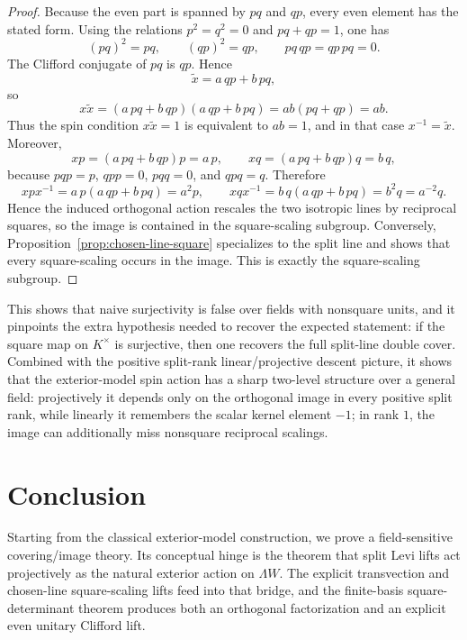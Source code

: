 \documentclass{birkjour}
\theoremstyle{plain}
\theoremstyle{definition}
\theoremstyle{remark}
\newcommand{\wedgeW}{\Lambda W}
\begin{document}
\begin{proof}
Because the even part is spanned by $pq$ and $qp$, every even element has the
stated form. Using the relations $p^2=q^2=0$ and $pq+qp=1$, one has
\[
  (pq)^2=pq,\qquad (qp)^2=qp,\qquad pq\,qp=qp\,pq=0.
\]
The Clifford conjugate of \(pq\) is \(qp\).
Hence
\[
  \tilde x = a\,qp+b\,pq,
\]
so
\[
  x\tilde x
  =(a\,pq+b\,qp)(a\,qp+b\,pq)
  =ab(pq+qp)
  =ab.
\]
Thus the spin condition $x\tilde x=1$ is equivalent to $ab=1$, and in that case
$x^{-1}=\tilde x$. Moreover,
\[
  xp=(a\,pq+b\,qp)p=a\,p,\qquad xq=(a\,pq+b\,qp)q=b\,q,
\]
because $pqp=p$, $qpp=0$, $pqq=0$, and $qpq=q$. Therefore
\[
  xpx^{-1}=a\,p(a\,qp+b\,pq)=a^2p,
  \qquad
  xqx^{-1}=b\,q(a\,qp+b\,pq)=b^2q=a^{-2}q.
\]
Hence the induced orthogonal action rescales the two isotropic lines by
reciprocal squares, so the image is contained in the square-scaling subgroup.
Conversely, Proposition~{}\ref{prop:chosen-line-square} specializes to the split
line and shows that every square-scaling occurs in the image. This is exactly
the square-scaling subgroup.
\end{proof}

This shows that naive surjectivity is false over fields with nonsquare units,
and it pinpoints the extra hypothesis needed to recover the expected statement:
if the square map on $K^\times$ is surjective, then one recovers the full
split-line double cover. Combined with the positive split-rank
linear/projective descent picture, it shows that the exterior-model spin action
has a sharp two-level structure over a general field: projectively it depends
only on the orthogonal image in every positive split rank, while linearly it
remembers the scalar kernel element $-1$; in rank $1$, the image can
additionally miss nonsquare reciprocal scalings.

\section{Conclusion}
\label{sec:conclusion}

Starting from the classical exterior-model construction, we prove a
field-sensitive covering/image theory. Its conceptual hinge is
the theorem that split Levi lifts act projectively as the natural exterior
action on $\wedgeW$. The explicit transvection and chosen-line
square-scaling lifts feed into that bridge, and the finite-basis
square-determinant theorem produces both an orthogonal factorization and an
explicit even unitary Clifford lift.
\end{document}
